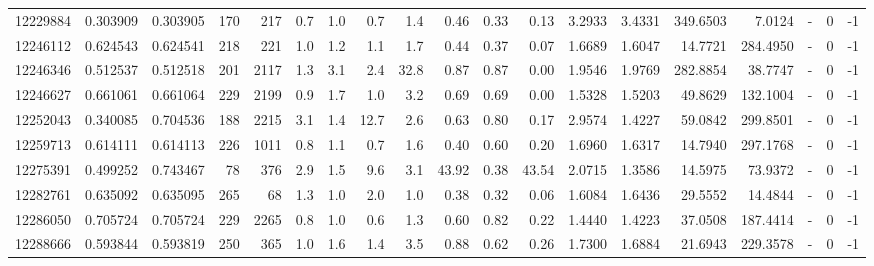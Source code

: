 \begin{tabular}{rrrrrrrrrrrrrrrrlrr}
  12229884 & 0.303909 &   0.303905 &  170 &  217 &      0.7 &      1.0 &     0.7 &      1.4 &       0.46 &        0.33 &        0.13 &  3.2933 &  3.4331 &  349.6503 &    7.0124 &             - &        0 &         -1 \\
  12246112 & 0.624543 &   0.624541 &  218 &  221 &      1.0 &      1.2 &     1.1 &      1.7 &       0.44 &        0.37 &        0.07 &  1.6689 &  1.6047 &   14.7721 &  284.4950 &             - &        0 &         -1 \\
  12246346 & 0.512537 &   0.512518 &  201 & 2117 &      1.3 &      3.1 &     2.4 &     32.8 &       0.87 &        0.87 &        0.00 &  1.9546 &  1.9769 &  282.8854 &   38.7747 &             - &        0 &         -1 \\
  12246627 & 0.661061 &   0.661064 &  229 & 2199 &      0.9 &      1.7 &     1.0 &      3.2 &       0.69 &        0.69 &        0.00 &  1.5328 &  1.5203 &   49.8629 &  132.1004 &             - &        0 &         -1 \\
  12252043 & 0.340085 &   0.704536 &  188 & 2215 &      3.1 &      1.4 &    12.7 &      2.6 &       0.63 &        0.80 &        0.17 &  2.9574 &  1.4227 &   59.0842 &  299.8501 &             - &        0 &         -1 \\
  12259713 & 0.614111 &   0.614113 &  226 & 1011 &      0.8 &      1.1 &     0.7 &      1.6 &       0.40 &        0.60 &        0.20 &  1.6960 &  1.6317 &   14.7940 &  297.1768 &             - &        0 &         -1 \\
  12275391 & 0.499252 &   0.743467 &   78 &  376 &      2.9 &      1.5 &     9.6 &      3.1 &      43.92 &        0.38 &       43.54 &  2.0715 &  1.3586 &   14.5975 &   73.9372 &             - &        0 &         -1 \\
  12282761 & 0.635092 &   0.635095 &  265 &   68 &      1.3 &      1.0 &     2.0 &      1.0 &       0.38 &        0.32 &        0.06 &  1.6084 &  1.6436 &   29.5552 &   14.4844 &             - &        0 &         -1 \\
  12286050 & 0.705724 &   0.705724 &  229 & 2265 &      0.8 &      1.0 &     0.6 &      1.3 &       0.60 &        0.82 &        0.22 &  1.4440 &  1.4223 &   37.0508 &  187.4414 &             - &        0 &         -1 \\
  12288666 & 0.593844 &   0.593819 &  250 &  365 &      1.0 &      1.6 &     1.4 &      3.5 &       0.88 &        0.62 &        0.26 &  1.7300 &  1.6884 &   21.6943 &  229.3578 &             - &        0 &         -1 \\

\end{tabular}
